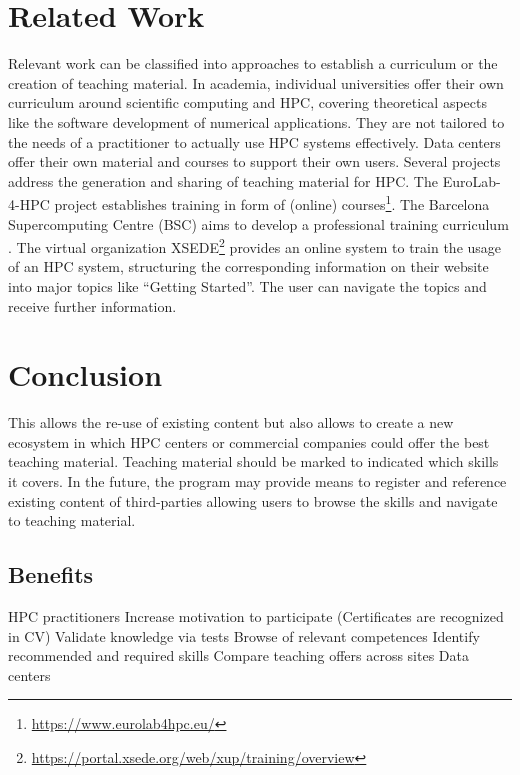 \documentclass[jocse]{jocseart}
\newcommand{\jk}[1]{\todo[inline]{TODO: #1}}
\begin{document}
\section{Related Work}

\label{sec:related}

\jk{Please everyone!}

Relevant work can be classified into approaches to establish a curriculum or the creation of teaching material.
In academia, individual universities offer their own curriculum around scientific computing and HPC, covering theoretical aspects like the software development of numerical applications.
They are not tailored to the needs of a practitioner to actually use HPC systems effectively.
Data centers offer their own material and courses to support their own users.
Several projects address the generation and sharing of teaching material for HPC.
The EuroLab-4-HPC project establishes training in form of (online) courses\footnote{\url{https://www.eurolab4hpc.eu/}}.
The Barcelona Supercomputing Centre (BSC) aims to develop a professional training curriculum \cite{sancho2016bsc}.
The virtual organization XSEDE\footnote{\url{https://portal.xsede.org/web/xup/training/overview}} provides an online system to train the usage of an HPC system, structuring the corresponding information on their website into major topics like “Getting Started”.
The user can navigate the topics and receive further information.

\section{Conclusion}
\label{sec:conclusion}


This allows the re-use of existing content but also allows to create a new ecosystem in which HPC centers or commercial companies could offer the best teaching material.
Teaching material should be marked to indicated which skills it covers.
In the future, the program may provide means to register and reference existing content of third-parties allowing users to browse the skills and navigate to teaching material.


\subsection{Benefits}

HPC practitioners
Increase motivation to participate
(Certificates are recognized in CV)
Validate knowledge via tests
Browse of relevant competences
Identify recommended and required skills
Compare teaching offers across sites
Data centers
\end{document}

